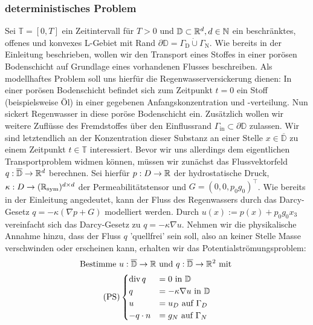 \subsubsection{deterministisches Problem}
Sei $\mathbb{T} = [0,T]$ ein Zeitintervall für $T>0$ und $\mathbb{D} \subset \mathbb{R}^d , d \in \mathbb{N}$ ein beschränktes, offenes und konvexes L-Gebiet mit Rand $ \partial \mathbb{D} = \Gamma_{\text{D}}  \dot{\cup} \Gamma_{\text{N}} $. 
Wie bereits in der Einleitung beschrieben, wollen wir den Transport eines Stoffes in einer porösen Bodenschicht auf Grundlage eines vorhandenen Flusses beschreiben. 
Als modellhaftes Problem soll uns hierfür die Regenwasserversickerung dienen: In einer porösen Bodenschicht befindet sich zum Zeitpunkt $t=0$ ein Stoff (beispielsweise Öl) in einer gegebenen Anfangskonzentration und -verteilung. Nun sickert Regenwasser in diese poröse Bodenschicht ein. Zusätzlich wollen wir weitere Zuflüsse des Fremdstoffes über den Einflussrand $\Gamma_{\text{in}} \subset \partial \mathbb{D}$ zulassen.
Wir sind letztendlich an der Konzentration dieser Substanz an einer Stelle $x \in \overline{\mathbb{D}}$ zu einem Zeitpunkt $t \in \mathbb{T}$ interessiert. \newline
Bevor wir uns allerdings dem eigentlichen Transportproblem widmen können, müssen wir zunächst das Flussvektorfeld $q: \overline{\mathbb{D}} \rightarrow \mathbb{R}^d$ berechnen. \newline
Sei hierfür $p: D \rightarrow \mathbb{R}$ der hydrostatische Druck, $\kappa: D \rightarrow (\mathbb{R}_{\text{sym}})^{d \times d}$ der Permeabilitätstensor und $G=(0,0,p_0 g_0)^{\top}$. 
Wie bereits in der Einleitung angedeutet, kann der Fluss des Regenwassers durch das Darcy-Gesetz $q=-\kappa(\nabla p + G)$ modelliert werden.
Durch $u(x) := p(x) + p_0 g_0 x_3$ vereinfacht sich das Darcy-Gesetz zu $q=-\kappa \nabla u$.\newline
Nehmen wir die physikalische Annahme hinzu, dass der Fluss $q$ 'quellfrei' sein soll, also an keiner Stelle Masse verschwinden oder erscheinen kann, erhalten wir das Potentialströmungsproblem:
\begin{gather*}
\text{Bestimme } u:\overline{\mathbb{D}} \to \mathbb{R} \text{ und } q: \overline{\mathbb{D}} \to \mathbb{R}^2 \text{ mit } \\
\text{(PS)}\begin{cases}
\operatorname{div} q &= 0 \text{ in } \mathbb{D}\\
q &= - \kappa \nabla u \text{ in } \mathbb{D}\\
u &= u_D \text{ auf } \Gamma_D \\
-q \cdot n &= g_N \text{ auf } \Gamma_N \\
\end{cases}
\end{gather*} 
